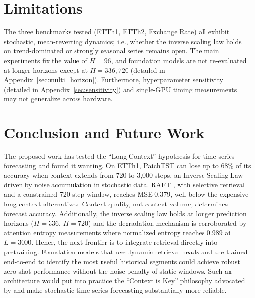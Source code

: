 \documentclass{article} %
\begin{document}
\section{Limitations}

The three benchmarks tested (ETTh1, ETTh2, Exchange Rate) all exhibit stochastic, mean-reverting dynamics; i.e., whether the inverse scaling law holds on trend-dominated or strongly seasonal series remains open. The main experiments fix the value of $H{=}96$, and foundation models are not re-evaluated at longer horizons except at $H{=}336, 720$ (detailed in Appendix~\ref{sec:multi_horizon}). Furthermore, hyperparameter sensitivity (detailed in Appendix~\ref{sec:sensitivity}) and single-GPU timing measurements may not generalize across hardware.

\section{Conclusion and Future Work}

The proposed work has tested the ``Long Context'' hypothesis for time series forecasting and found it wanting. On ETTh1, PatchTST can lose up to 68\% of its accuracy when context extends from 720 to 3,000 steps, an Inverse Scaling Law driven by noise accumulation in stochastic data. RAFT \citep{han2025raft}, with selective retrieval and a constrained 720-step window, reaches MSE 0.379, well below the expensive long-context alternatives. Context quality, not context volume, determines forecast accuracy. Additionally, the inverse scaling law holds at longer prediction horizons ($H=336$, $H=720$) and the degradation mechanism is corroborated by attention entropy measurements where normalized entropy reaches 0.989 at $L=3000$.
Hence, the next frontier is to integrate retrieval directly into pretraining. Foundation models that use dynamic retrieval heads and are trained end-to-end to identify the most useful historical segments could achieve robust zero-shot performance without the noise penalty of static windows. Such an architecture would put into practice the ``Context is Key'' philosophy advocated by \cite{williams2025context} and make stochastic time series forecasting substantially more reliable.




\clearpage
\renewcommand{\thetable}{A\arabic{table}}
\renewcommand{\thefigure}{A\arabic{figure}}
\setcounter{table}{0}
\setcounter{figure}{0}
\appendix
\end{document}

